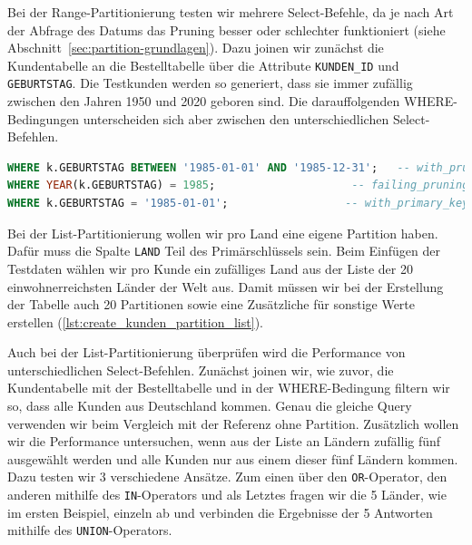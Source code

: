 \vspace{-5pt}


Bei der Range-Partitionierung testen wir mehrere Select-Befehle, da je nach Art der Abfrage des Datums das Pruning besser oder schlechter funktioniert (siehe Abschnitt~\ref{sec:partition-grundlagen}).
Dazu joinen wir zunächst die Kundentabelle an die Bestelltabelle über die Attribute \texttt{KUNDEN\_ID} und \texttt{GEBURTSTAG}.
Die Testkunden werden so generiert, dass sie immer zufällig zwischen den Jahren 1950 und 2020 geboren sind.
Die darauffolgenden WHERE-Bedingungen unterscheiden sich aber zwischen den unterschiedlichen Select-Befehlen.

\vspace{-5pt}
\begin{lstlisting}[language=SQL,caption=Unterschiedliche WHERE-Bedingungen,label={lst:different_where_conditions}]
WHERE k.GEBURTSTAG BETWEEN '1985-01-01' AND '1985-12-31'; 	-- with_pruning.sql
WHERE YEAR(k.GEBURTSTAG) = 1985;		             -- failing_pruning.sql
WHERE k.GEBURTSTAG = '1985-01-01';		            -- with_primary_key.sql
\end{lstlisting}
\vspace{-5pt}

Bei der List-Partitionierung wollen wir pro Land eine eigene Partition haben.
Dafür muss die Spalte \texttt{LAND} Teil des Primärschlüssels sein.
Beim Einfügen der Testdaten wählen wir pro Kunde ein zufälliges Land aus der Liste der 20 einwohnerreichsten Länder der Welt aus.
Damit müssen wir bei der Erstellung der Tabelle auch 20 Partitionen sowie eine Zusätzliche für sonstige Werte erstellen (\ref{lst:create_kunden_partition_list}).

\vspace{-5pt}

\vspace{-5pt}

Auch bei der List-Partitionierung überprüfen wird die Performance von unterschiedlichen Select-Befehlen.
Zunächst joinen wir, wie zuvor, die Kundentabelle mit der Bestelltabelle und in der WHERE-Bedingung filtern wir so, dass alle Kunden aus Deutschland kommen.
Genau die gleiche Query verwenden wir beim Vergleich mit der Referenz ohne Partition.
Zusätzlich wollen wir die Performance untersuchen, wenn aus der Liste an Ländern zufällig fünf ausgewählt werden und alle Kunden nur aus einem dieser fünf Ländern kommen.
Dazu testen wir 3 verschiedene Ansätze.
Zum einen über den \texttt{OR}-Operator, den anderen mithilfe des \texttt{IN}-Operators und als Letztes fragen wir die 5 Länder, wie im ersten Beispiel, einzeln ab und verbinden die Ergebnisse der 5 Antworten mithilfe des \texttt{UNION}-Operators.

